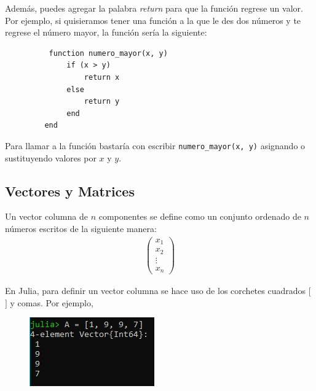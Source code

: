 Además, puedes agregar la palabra \textit{return} para que la función regrese un valor. Por ejemplo, si quisieramos tener una función a la que le des dos números y te regrese el número mayor, la función sería la siguiente:

\begin{tcolorbox}
      \begin{verbatim}
          function numero_mayor(x, y)
              if (x > y)
                  return x 
              else
                  return y
              end
         end
      \end{verbatim}
\end{tcolorbox}


Para llamar a la función bastaría con escribir \texttt{numero\_mayor(x, y)} asignando o sustituyendo valores por $x$ y $y$. 

\subsection{Vectores y Matrices}

\begin{definition}
Un vector columna de $n$ componentes se define como un conjunto ordenado de $n$ números escritos de la siguiente manera:
\begin{equation*}
    \begin{aligned}
    \begin{pmatrix}
    x_1 \\ 
    x_2 \\
    \vdots \\
    x_n
    \end{pmatrix} 
    \end{aligned}
\end{equation*}
\end{definition}


En Julia, para definir un vector columna se hace uso de los corchetes cuadrados $[$ $]$ y comas. Por ejemplo, 

\begin{figure}[h]
\begin{center}
\includegraphics[scale=0.8]{Imagenes/vector_columna_julia.JPG}
  \label{vector_columna}
\end{center}
\end{figure}

